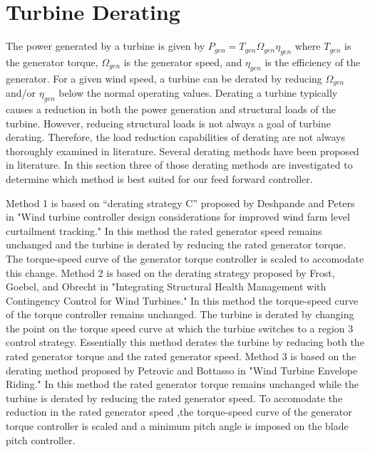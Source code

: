 
\section{Turbine Derating} \label{section4-2}

The power generated by a turbine is given by $P_{gen} = T_{gen}\Omega_{gen}\eta_{gen}$ where $T_{gen}$ is the generator torque, $\Omega_{gen}$ is the generator speed, and $\eta_{gen}$ is the efficiency of the generator. For a given wind speed, a turbine can be derated by reducing $\Omega_{gen}$ and/or $\eta_{gen}$ below the normal operating values. Derating a turbine typically causes a reduction in both the power generation and structural loads of the turbine. However, reducing structural loads is not always a goal of turbine derating. Therefore, the load reduction capabilities of derating are not always thoroughly examined in literature. Several derating methods have been proposed in literature. In this section three of those derating methods are investigated to determine which method is best suited for our feed forward controller.

Method 1 is based on “derating strategy C” proposed by Deshpande and Peters in "Wind turbine controller design considerations for improved wind farm level curtailment tracking."\cite{deshpande2012} In this method the rated generator speed remains unchanged and the turbine is derated by reducing the rated generator torque. The torque-speed curve of the generator torque controller is scaled to accomodate this change. Method 2 is based on the derating strategy proposed by Frost, Goebel, and Obrecht in "Integrating Structural Health Management with Contingency Control for Wind Turbines."\cite{frost2013} In this method the torque-speed curve of the torque controller remains unchanged. The turbine is derated by changing the point on the torque speed curve at which the turbine switches to a region 3 control strategy. Essentially this method derates the turbine by reducing both the rated generator torque and the rated generator speed. Method 3 is based on the derating method proposed by Petrovic and Bottasso in "Wind Turbine Envelope Riding."\cite{petrovic2015} In this method the rated generator torque remains unchanged while the turbine is derated by reducing the rated generator speed. To accomodate the reduction in the rated generator speed ,the torque-speed curve of the generator torque controller is scaled and a minimum pitch angle is imposed on the blade pitch controller.


